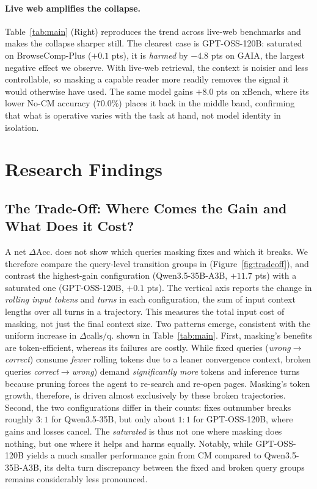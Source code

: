 \paragraph{Live web amplifies the collapse.}
Table~\ref{tab:main} (Right) reproduces the trend across live-web benchmarks and makes the collapse sharper still. The clearest case is GPT-OSS-120B: saturated on
BrowseComp-Plus ($+0.1$ pts), it is \emph{harmed} by $-4.8$ pts on GAIA, the
largest negative effect we observe. With live-web retrieval, the context is
noisier and less controllable, so masking a capable reader more readily
removes the signal it would otherwise have used. The same model gains $+8.0$ pts on xBench, where its lower No-CM accuracy ($70.0\%$) places it back in the middle band, confirming that what is operative varies with the task at hand, not model identity in isolation.

\section{Research Findings}
\label{sec:findings}
\subsection{The Trade-Off: Where Comes the Gain and What Does it Cost?}
\label{exp:trade-off}


A net $\Delta\text{Acc.}$ does not show which queries masking fixes and
which it breaks. We therefore compare the query-level transition groups in (Figure~\ref{fig:tradeoff}), and contrast the highest-gain configuration (Qwen3.5-35B-A3B, $+11.7$ pts) with a saturated one (GPT-OSS-120B, $+0.1$ pts). The vertical axis reports the change
in \emph{rolling input tokens} and \emph{turns} in each configuration, the sum of input context lengths over all turns in a trajectory. This measures the total input cost of masking, not just the final context size.
Two patterns emerge, consistent with the uniform increase in $\Delta\text{calls/q.}$ shown in Table~\ref{tab:main}. First, masking's benefits are token-efficient, whereas its failures are costly. While fixed queries (\textit{wrong$\rightarrow$correct}) consume \emph{fewer} rolling tokens due to a leaner convergence context, broken queries \textit{correct$\rightarrow$wrong}) demand \emph{significantly more} tokens and inference turns because pruning forces the agent to re-search and re-open pages. Masking's token growth, therefore, is driven almost exclusively by these broken trajectories. Second, the two configurations differ in their counts: fixes outnumber breaks roughly $3{:}1$ for Qwen3.5-35B, but only about $1{:}1$ for GPT-OSS-120B, where gains and losses cancel. The \textit{saturated} is thus not one where masking does nothing, but one where it helps and harms equally. Notably, while GPT-OSS-120B yields a much smaller performance gain from CM compared to Qwen3.5-35B-A3B, its delta turn discrepancy between the fixed and broken query groups remains considerably less pronounced.


